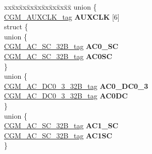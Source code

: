\begin{DoxyCompactItemize}
\begin{tabbing}
\end{tabbing}\item 
\mbox{\label{structCGM__struct__tag_a7842965288cad92787a12bd1ee82840a}} 
\begin{tabbing}
xx\=xx\=xx\=xx\=xx\=xx\=xx\=xx\=xx\=\kill
union \{\\
\>\mbox{\hyperlink{structCGM__AUXCLK__struct__tag}{CGM\_AUXCLK\_tag}} {\bfseries AUXCLK} \mbox{[}6\mbox{]}\\
\mbox{\label{unionCGM__struct__tag_1_1_0D1678_a5dfaf27e5015e64cd67437f56ddaef42}} 
\>struct \{\\
\mbox{\label{structCGM__struct__tag_1_1_0D1678_1_1_0D1686_ad006bf9e579269c707d9c981fed64a9d}} 
\>\>union \{\\
\>\>\>\mbox{\hyperlink{unionCGM__AC__SC__32B__tag}{CGM\_AC\_SC\_32B\_tag}} {\bfseries AC0\_SC}\\
\>\>\>\mbox{\hyperlink{unionCGM__AC__SC__32B__tag}{CGM\_AC\_SC\_32B\_tag}} {\bfseries AC0SC}\\
\>\>\} \\
\mbox{\label{structCGM__struct__tag_1_1_0D1678_1_1_0D1686_ab194040be15f63a3e236c02babc366bd}} 
\>\>union \{\\
\>\>\>\mbox{\hyperlink{unionCGM__AC__DC0__3__32B__tag}{CGM\_AC\_DC0\_3\_32B\_tag}} {\bfseries AC0\_DC0\_3}\\
\>\>\>\mbox{\hyperlink{unionCGM__AC__DC0__3__32B__tag}{CGM\_AC\_DC0\_3\_32B\_tag}} {\bfseries AC0DC}\\
\>\>\} \\
\mbox{\label{structCGM__struct__tag_1_1_0D1678_1_1_0D1686_ae7b082a1f7c0a4ce36df63fe370e924a}} 
\>\>union \{\\
\>\>\>\mbox{\hyperlink{unionCGM__AC__SC__32B__tag}{CGM\_AC\_SC\_32B\_tag}} {\bfseries AC1\_SC}\\
\>\>\>\mbox{\hyperlink{unionCGM__AC__SC__32B__tag}{CGM\_AC\_SC\_32B\_tag}} {\bfseries AC1SC}\\
\>\>\} \\
\mbox{\label{structCGM__struct__tag_1_1_0D1678_1_1_0D1686_aa58ca42c1b6e739884dbed8600cb660e}} 

\end{tabbing}
\end{DoxyCompactItemize}
